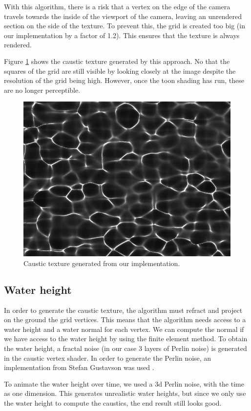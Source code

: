 \documentclass{article}
\begin{document}
\noindent
With this algorithm, there is a risk that a vertex on the edge of the camera travels towards the 
inside of the viewport of the camera, leaving an unrendered section on the side of the texture. 
To prevent this, the grid is created too big (in our implementation by a factor of 1.2). 
This ensures that the texture is always rendered.

\medskip \par
\noindent
Figure \ref{fig:caustics_texture} shows the caustic texture generated by this approach. 
No that the squares of the grid are still visible by looking closely at the image despite the resolution 
of the grid being high. However, once the toon shading has run, these are no longer perceptible.

\begin{figure}[h]
    \centering
    \includegraphics[width=.6\columnwidth]{imgs/caustics_texture.png}
    \caption{Caustic texture generated from our implementation.}
    \label{fig:caustics_texture}
\end{figure}

\vspace{-1em}

\subsection{Water height}
In order to generate the caustic texture, the algorithm must refract and project on the ground 
the grid vertices. This means that the algorithm needs access to a water height and a water normal 
for each vertex. We can compute the normal if we have access to the water height by using the finite 
element method. To obtain the water height, a fractal noise (in our case 3 layers of Perlin noise) is 
generated in the caustic vertex shader. In order to generate the Perlin noise, an implementation from 
Stefan Gustavson was used \cite{perlin_noise}.

\medskip \par
\noindent
To animate the water height over time, we used a 3d Perlin noise, with the time as one dimension. 
This generates unrealistic water heights, but since we only use the water height to compute the caustics, 
the end result still looks good.
\end{document}
